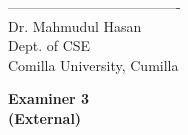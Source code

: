 \vspace{1.8cm}

\noindent
\begin{minipage}[t]{0.6\textwidth}
     ------------------------------------- \\
    Dr. Mahmudul Hasan \\
    Dept. of CSE \\
    Comilla University, Cumilla
\end{minipage}
\hfill
\begin{minipage}[t]{0.35\textwidth}
    \raggedleft
    \textbf{Examiner 3} \\
    \textbf{(External)}
\end{minipage}
